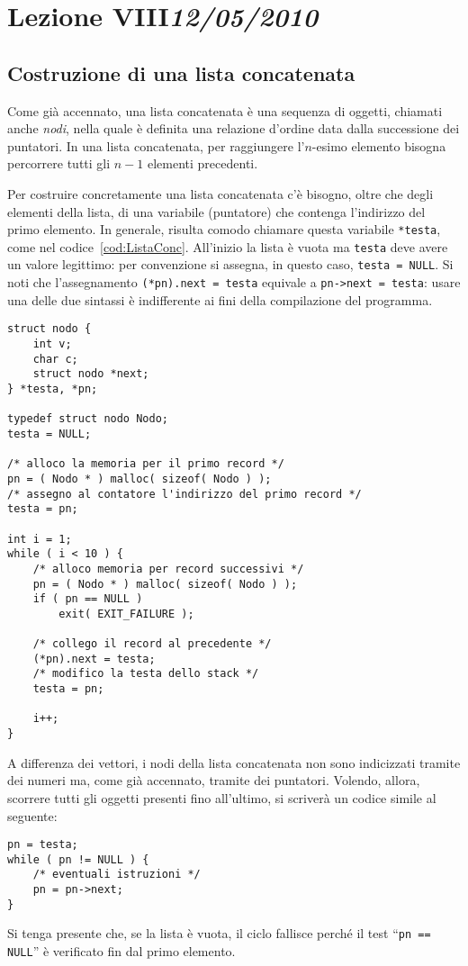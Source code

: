 \chapter[Lezione VIII]{Lezione VIII\newline\small\emph{12/05/2010}}
	\section{Costruzione di una lista concatenata}
Come già accennato, una lista concatenata è una sequenza di oggetti, chiamati anche \emph{nodi}, nella quale è definita una relazione d'ordine data dalla successione dei puntatori.
In una lista concatenata, per raggiungere l'$n$-esimo elemento bisogna percorrere tutti gli $n-1$ elementi precedenti.

Per costruire concretamente una lista concatenata c'è bisogno, oltre che degli elementi della lista, di una variabile (puntatore) che contenga l'indirizzo del primo elemento.
In generale, risulta comodo chiamare questa variabile \lstinline!*testa!, come nel codice~\ref{cod:ListaConc}.
All'inizio la lista è vuota ma \lstinline!testa! deve avere un valore legittimo: per convenzione si assegna, in questo caso, \lstinline!testa = NULL!.
Si noti che l'assegnamento \lstinline!(*pn).next = testa! equivale a \lstinline!pn->next = testa!: usare una delle due sintassi è indifferente ai fini della compilazione del programma.
\begin{lstlisting}[caption={\em Costruzione di una lista concatenata.}, label={cod:ListaConc}]
struct nodo {
	int v;
	char c;
	struct nodo *next;
} *testa, *pn;

typedef struct nodo Nodo;
testa = NULL;

/* alloco la memoria per il primo record */
pn = ( Nodo * ) malloc( sizeof( Nodo ) );
/* assegno al contatore l'indirizzo del primo record */
testa = pn;

int i = 1;
while ( i < 10 ) {
	/* alloco memoria per record successivi */
	pn = ( Nodo * ) malloc( sizeof( Nodo ) );	
	if ( pn == NULL )
		exit( EXIT_FAILURE );

	/* collego il record al precedente */
	(*pn).next = testa;
	/* modifico la testa dello stack */
	testa = pn;

	i++;
} 
\end{lstlisting}

A differenza dei vettori, i nodi della lista concatenata non sono indicizzati tramite dei numeri ma, come già accennato, tramite dei puntatori. Volendo, allora, scorrere tutti gli oggetti presenti fino all'ultimo, si scriverà un codice simile al seguente:
\begin{lstlisting}
pn = testa;
while ( pn != NULL ) {
	/* eventuali istruzioni */
	pn = pn->next;
}
\end{lstlisting}
Si tenga presente che, se la lista è vuota, il ciclo fallisce perché il test ``\lstinline!pn == NULL!'' è verificato fin dal primo elemento.

